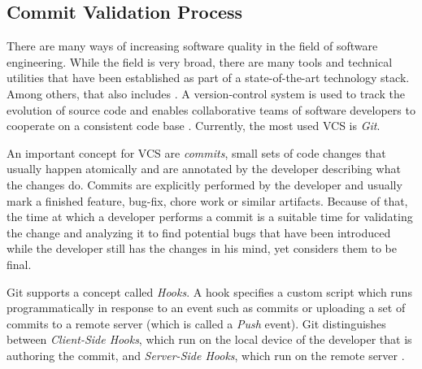 \subsection{Commit Validation Process}
\label{sec:cvprocess}



There are many ways of increasing software quality in the field of software engineering. While the field is very broad, there are many tools and technical utilities that have been established as part of a state-of-the-art technology stack. Among others, that also includes . A version-control system is used to track the evolution of source code and enables collaborative teams of software developers to cooperate on a consistent code base \cite{Chacon:2014:PG:2695634}. Currently, the most used VCS is \textit{Git}. %

An important concept for VCS are \textit{commits}, small sets of code changes that usually happen atomically and are annotated by the developer describing what the changes do. Commits are explicitly performed by the developer and usually mark a finished feature, bug-fix, chore work or similar artifacts. Because of that, the time at which a developer performs a commit is a suitable time for validating the change and analyzing it to find potential bugs that have been introduced while the developer still has the changes in his mind, yet considers them to be final. %

Git supports a concept called \textit{Hooks}. A hook specifies a custom script which runs programmatically in response to an event such as commits or uploading a set of commits to a remote server (which is called a \textit{Push} event). 
Git distinguishes between \textit{Client-Side Hooks}, which run on the local device of the developer that is authoring the commit, and \textit{Server-Side Hooks}, which run on the remote server \cite{Chacon:2014:PG:2695634}.

